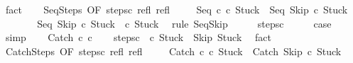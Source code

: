 \begin{isabellebody}
\ fact\isanewline
\ \ \isamarkupfalse%
\ SeqSteps\ {\isacharbrackleft}OF\ steps{\isacharunderscore}c\ refl\ refl{\isacharbrackright}\isanewline
\ \ \isamarkupfalse%
\ {\isachardoublequoteopen}{\isasymGamma}{\isasymturnstile}\ {\isacharparenleft}Seq\ c\ c\ Stuck{\isacharparenright}\ {\isasymrightarrow}\isactrlsup {\isacharasterisk}\ {\isacharparenleft}Seq\ Skip\ c\ Stuck{\isacharparenright}{\isachardoublequoteclose}\isacommand{{\isachardot}}\isamarkupfalse%
\isanewline
\ \ \isamarkupfalse%
\isanewline
\ \ \isamarkupfalse%
\ {\isachardoublequoteopen}{\isasymGamma}{\isasymturnstile}\ {\isacharparenleft}Seq\ Skip\ c\ Stuck{\isacharparenright}\ {\isasymrightarrow}\ {\isacharparenleft}c\ Stuck{\isacharparenright}{\isachardoublequoteclose}\ \isamarkupfalse%
\ {\isacharparenleft}rule\ SeqSkip{\isacharparenright}\isanewline
\ \ \isamarkupfalse%
\ \isamarkupfalse%
\ steps{\isacharunderscore}c\isanewline
\ \ \isamarkupfalse%
\ \isamarkupfalse%
\ {\isacharquery}case\ \isamarkupfalse%
\ simp\isanewline
{}\isamarkupfalse%
\isanewline
\ \ \isamarkupfalse%
\ {\isacharparenleft}Catch\ c\ c\isanewline
\ \ \isamarkupfalse%
\ steps{\isacharunderscore}c\ {\isachardoublequoteopen}{\isasymGamma}{\isasymturnstile}\ {\isacharparenleft}c\ Stuck{\isacharparenright}\ {\isasymrightarrow}\isactrlsup {\isacharasterisk}\ {\isacharparenleft}Skip{\isacharcomma}\ Stuck{\isacharparenright}{\isachardoublequoteclose}\ \isamarkupfalse%
\ fact\isanewline
\ \ \isamarkupfalse%
\ CatchSteps\ {\isacharbrackleft}OF\ steps{\isacharunderscore}c\ refl\ refl{\isacharbrackright}\isanewline
\ \ \isamarkupfalse%
\ {\isachardoublequoteopen}{\isasymGamma}{\isasymturnstile}\ {\isacharparenleft}Catch\ c\ c\ Stuck{\isacharparenright}\ {\isasymrightarrow}\isactrlsup {\isacharasterisk}\ {\isacharparenleft}Catch\ Skip\ c\ Stuck{\isacharparenright}{\isachardoublequoteclose}\ \isacommand{{\isachardot}}\isamarkupfalse%

\end{isabellebody}
